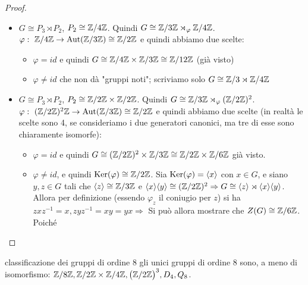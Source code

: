 \begin{proof}
\begin{itemize}
        \item $G \cong P_3 \rtimes P_2$, $P_2 \cong \mathbb{Z} / 4 \mathbb{Z}$. Quindi $G \cong  \mathbb{Z} / 3 \mathbb{Z} \rtimes_{\varphi} \mathbb{Z} / 4 \mathbb{Z}$. $\varphi : \  \mathbb{Z} / 4 \mathbb{Z} \rightarrow \text{Aut}(\mathbb{Z} / 3 \mathbb{Z}) \cong \mathbb{Z} / 2 \mathbb{Z}$ e quindi abbiamo due scelte:
        \begin{itemize}
            \item $\varphi = id$ e quindi  $G \cong \mathbb{Z} / 4 \mathbb{Z} \times \mathbb{Z} / 3 \mathbb{Z} \cong \mathbb{Z} / 12 \mathbb{Z}$ (già visto)
            \item $\varphi \neq id$ che non dà "gruppi noti"; scriviamo solo $G \cong \mathbb{Z}/3\rtimes \mathbb{Z}/4\mathbb{Z}$
        \end{itemize} 
        \item $G \cong P_3 \rtimes P_2$, $P_2 \cong \mathbb{Z} / 2 \mathbb{Z} \times \mathbb{Z}/2\mathbb{Z}$. Quindi $G \cong \mathbb{Z} / 3 \mathbb{Z}  \rtimes_{\varphi} (\mathbb{Z}/2\mathbb{Z})^2$. $\varphi : \  (\mathbb{Z}/2\mathbb{Z})^2 \mathbb{Z} \rightarrow \text{Aut}(\mathbb{Z} / 3 \mathbb{Z}) \cong \mathbb{Z} / 2 \mathbb{Z}$ e quindi abbiamo due scelte (in realtà le scelte sono 4, se consideriamo i due generatori canonici, ma tre di esse sono chiaramente isomorfe):
        \begin{itemize}
            \item $\varphi = id$ e quindi $G \cong (\mathbb{Z} / 2 \mathbb{Z})^2 \times \mathbb{Z} / 3 \mathbb{Z} \cong  \mathbb{Z} / 2 \mathbb{Z} \times \mathbb{Z} / 6 \mathbb{Z}$ già visto. 
            \item $\varphi \neq id$, e quindi $\text{Ker}(\varphi) \cong \mathbb{Z}/2\mathbb{Z}$. Sia $\text{Ker}(\varphi) = \langle x \rangle$ con $x \in G$, e siano $y,z \in G$ tali che $\langle z \rangle \cong \mathbb{Z}/3\mathbb{Z}$ e $\langle x \rangle\langle y \rangle \cong (\mathbb{Z} / 2 \mathbb{Z})^2 \Rightarrow G \cong \langle z \rangle \rtimes \langle x \rangle\langle y \rangle$. Allora per definizione (essendo $\varphi_z$ il coniugio per $z$) si ha $zxz^{-1} = x, zyz^{-1} = xy = yx \Rightarrow $
        Si può allora mostrare che $Z(G) \cong \mathbb{Z}/6\mathbb{Z}$. Poiché
        \end{itemize} 
    \end{itemize}
\end{proof}
\begin{example2}{classificazione dei gruppi di ordine 8}
    gli unici gruppi di ordine $8$ sono, a meno di isomorfismo: $\mathbb{Z}/8\mathbb{Z}, \mathbb{Z}/2\mathbb{Z}\times \mathbb{Z}/4\mathbb{Z}, \big(\mathbb{Z}/2\mathbb{Z}\big)^3, D_4,Q_8$.
\end{example2}
